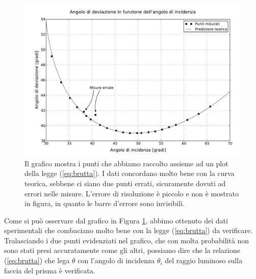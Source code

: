 \begin{figure}[h]
    \includegraphics[width=16cm]{graph.pdf}
    \caption{Il grafico mostra i punti che abbiamo raccolto assieme ad un plot della legge (\ref{eq:brutta}). I dati concordano
    molto bene con la curva teorica, sebbene ci siano due punti errati, sicuramente dovuti ad errori nelle misure. L'errore di
    risoluzione è piccolo e non è mostrato in figura, in quanto le barre d'errore sono invisibili.}
    \label{fig:dev}
\end{figure}

Come si può osservare dal grafico in Figura \ref{fig:dev}, abbimo ottenuto dei dati sperimentali che combaciano molto bene con la legge (\ref{eq:brutta}) da verificare. Tralasciando i due punti evidenziati nel grafico, che con molta probabilità non sono stati presi accuratamente come gli altri, possiamo dire che la relazione (\ref{eq:brutta}) che lega $\theta$ con l'angolo di incidenza $\theta_i$ del raggio luminoso sulla faccia del prisma è verificata.
